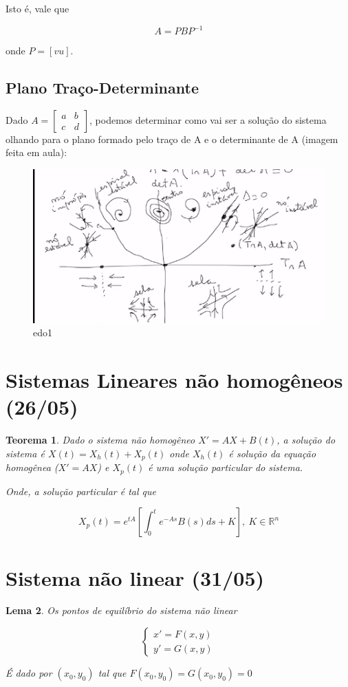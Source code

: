 \documentclass[12pt]{article}
\newtheorem{theorem}{Teorema}[section]
\newtheorem{lemma}[theorem]{Lema}
\begin{document}
Isto é, vale que

$$A = PBP^{-1}$$

onde $P = [v u]$.


\subsection*{Plano Traço-Determinante}
Dado $A = \left [ \begin{array}{cc}
    a & b \\
    c & d
\end{array} \right ]$, podemos determinar como vai ser a solução do sistema olhando para o plano formado pelo traço de A e o determinante de A (imagem feita em aula):

\begin{figure}[h]
    \centering
    \includegraphics{edo1.png}
    \caption{edo1}
    \label{fig:my_label}
\end{figure}


\section{Sistemas Lineares não homogêneos (26/05)}
\begin{theorem}
    Dado o sistema não homogêneo $X' = AX + B(t)$, a solução do sistema é $X(t) = X_h(t) + X_p(t)$ onde $X_h(t)$ é solução da equação homogênea ($X' = A X$) e $X_p(t)$ é uma solução particular do sistema.
    
    Onde, a solução particular é tal que
    
    $$X_p(t) = e^{t A} \left [ \int_0^t e^{- A s} B(s) d s + K \right ], \ K \in \mathbb{R}^n$$
\end{theorem}

\section{Sistema não linear (31/05)}
\begin{lemma}
    Os pontos de equilíbrio do sistema não linear
    
    $$ \left \{
    \begin{array}{ll}
        x' = F(x, y) \\
        y' = G(x, y)
    \end{array} \right .
    $$
    
    É dado por $(x_0, y_0)$ tal que $F(x_0, y_0) = G(x_0, y_0) = 0$ 
\end{lemma}
\end{document}
